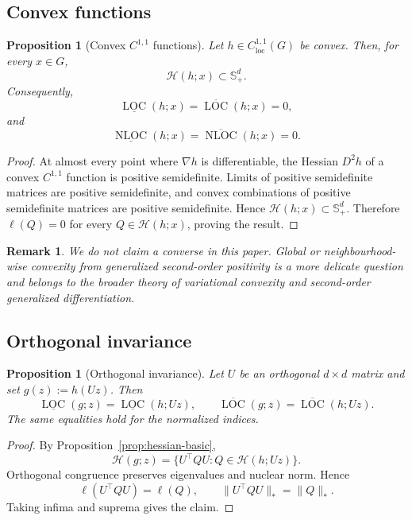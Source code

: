 \documentclass[11pt]{article}
\numberwithin{equation}{section}
\newtheorem{proposition}[theorem]{Proposition}
\newtheorem{remark}[theorem]{Remark}
\newcommand{\Spd}{\mathbb S^d_+}
\newcommand{\Hess}{\mathcal H}
\newcommand{\LOC}{\operatorname{LOC}}
\newcommand{\NLOC}{\operatorname{NLOC}}
\begin{document}
	\subsection{Convex functions}
	
	\begin{proposition}[Convex \(C^{1,1}\) functions]
		\label{prop:convex}
		Let \(h\in C^{1,1}_{\mathrm{loc}}(G)\) be convex. Then, for every \(x\in G\),
		\[
		\Hess(h;x)\subset\Spd.
		\]
		Consequently,
		\[
		\underline{\LOC}(h;x)
		=
		\overline{\LOC}(h;x)
		=
		0,
		\]
		and
		\[
		\underline{\NLOC}(h;x)
		=
		\overline{\NLOC}(h;x)
		=
		0.
		\]
	\end{proposition}
	
	\begin{proof}
		At almost every point where \(\nabla h\) is differentiable, the Hessian \(D^2h\) of a convex \(C^{1,1}\) function is positive semidefinite. Limits of positive semidefinite matrices are positive semidefinite, and convex combinations of positive semidefinite matrices are positive semidefinite. Hence \(\Hess(h;x)\subset\Spd\). Therefore \(\ell(Q)=0\) for every \(Q\in\Hess(h;x)\), proving the result.
	\end{proof}
	
	\begin{remark}
		We do not claim a converse in this paper. Global or neighbourhood-wise convexity from generalized second-order positivity is a more delicate question and belongs to the broader theory of variational convexity and second-order generalized differentiation.
	\end{remark}
	
	\subsection{Orthogonal invariance}
	
	\begin{proposition}[Orthogonal invariance]
		\label{prop:orthogonal}
		Let \(U\) be an orthogonal \(d\times d\) matrix and set \(g(z):=h(Uz)\). Then
		\[
		\underline{\LOC}(g;z)
		=
		\underline{\LOC}(h;Uz),
		\qquad
		\overline{\LOC}(g;z)
		=
		\overline{\LOC}(h;Uz).
		\]
		The same equalities hold for the normalized indices.
	\end{proposition}
	
	\begin{proof}
		By Proposition~\ref{prop:hessian-basic},
		\[
		\Hess(g;z)
		=
		\{U^\top Q U:Q\in\Hess(h;Uz)\}.
		\]
		Orthogonal congruence preserves eigenvalues and nuclear norm. Hence
		\[
		\ell(U^\top Q U)=\ell(Q),
		\qquad
		\|U^\top Q U\|_*=\|Q\|_*.
		\]
		Taking infima and suprema gives the claim.
	\end{proof}
	
\end{document}
